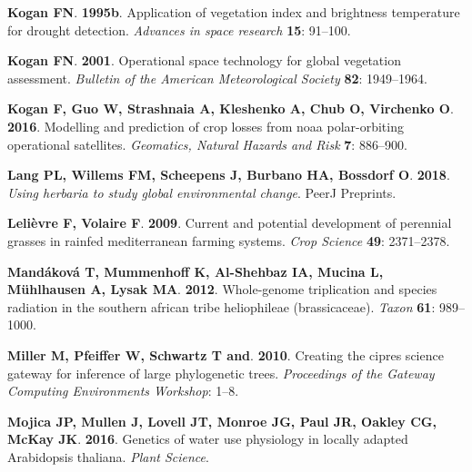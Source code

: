 \documentclass[man,floatsintext]{apa6}
\theoremstyle{definition}
\theoremstyle{definition}
\theoremstyle{definition}
\theoremstyle{remark}
\begin{document}
\leavevmode\hypertarget{ref-kogan1995application}{}%
\textbf{\textnormal{Kogan FN}}. \textbf{1995b}. Application of
vegetation index and brightness temperature for drought detection.
\emph{Advances in space research} \textbf{15}: 91--100.

\leavevmode\hypertarget{ref-kogan2001operational}{}%
\textbf{\textnormal{Kogan FN}}. \textbf{2001}. Operational space
technology for global vegetation assessment. \emph{Bulletin of the
American Meteorological Society} \textbf{82}: 1949--1964.

\leavevmode\hypertarget{ref-kogan2016modelling}{}%
\textbf{\textnormal{Kogan F}, \textnormal{Guo W}, \textnormal{Strashnaia
A}, \textnormal{Kleshenko A}, \textnormal{Chub O}, \textnormal{Virchenko
O}}. \textbf{2016}. Modelling and prediction of crop losses from noaa
polar-orbiting operational satellites. \emph{Geomatics, Natural Hazards
and Risk} \textbf{7}: 886--900.

\leavevmode\hypertarget{ref-lang2018using}{}%
\textbf{\textnormal{Lang PL}, \textnormal{Willems FM},
\textnormal{Scheepens J}, \textnormal{Burbano HA}, \textnormal{Bossdorf
O}}. \textbf{2018}. \emph{Using herbaria to study global environmental
change}. PeerJ Preprints.

\leavevmode\hypertarget{ref-lelievre2009current}{}%
\textbf{\textnormal{Lelièvre F}, \textnormal{Volaire F}}. \textbf{2009}.
Current and potential development of perennial grasses in rainfed
mediterranean farming systems. \emph{Crop Science} \textbf{49}:
2371--2378.

\leavevmode\hypertarget{ref-mandakova2012whole}{}%
\textbf{\textnormal{Mandáková T}, \textnormal{Mummenhoff K},
\textnormal{Al-Shehbaz IA}, \textnormal{Mucina L},
\textnormal{Mühlhausen A}, \textnormal{Lysak MA}}. \textbf{2012}.
Whole-genome triplication and species radiation in the southern african
tribe heliophileae (brassicaceae). \emph{Taxon} \textbf{61}: 989--1000.

\leavevmode\hypertarget{ref-miller2010creating}{}%
\textbf{\textnormal{Miller M}, \textnormal{Pfeiffer W},
\textnormal{Schwartz T and}}. \textbf{2010}. Creating the cipres science
gateway for inference of large phylogenetic trees. \emph{Proceedings of
the Gateway Computing Environments Workshop}: 1--8.

\leavevmode\hypertarget{ref-Mojica2016}{}%
\textbf{\textnormal{Mojica JP}, \textnormal{Mullen J},
\textnormal{Lovell JT}, \textnormal{Monroe JG}, \textnormal{Paul JR},
\textnormal{Oakley CG}, \textnormal{McKay JK}}. \textbf{2016}. Genetics
of water use physiology in locally adapted Arabidopsis thaliana.
\emph{Plant Science}.
\end{document}
